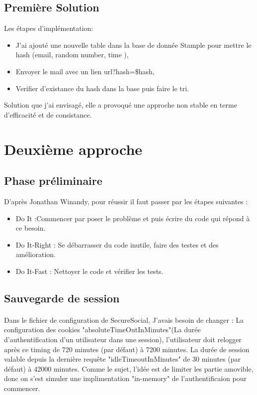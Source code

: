 \subsection{Première Solution}
Les étapes d'implémentation: 
\begin{itemize}
\item J'ai ajouté une nouvelle table dans la base de donnée Stample pour mettre le hash (email, random number, time ),
\item Envoyer le mail avec un lien url?hash=\$hash,
\item Verifier d'existance du hash dans la base puis faire le tri.

\end{itemize}
Solution que j'ai envisagé, elle a provoqué une approche non stable en terme d'efficacité et de consistance.
\newpage
\section{Deuxième approche}
\subsection{Phase préliminaire}
D'après Jonathan Winandy, pour réussir il faut passer par les étapes suivantes :
\begin{itemize}

\item Do It :Commencer par poser le problème et puis écrire du code qui répond à ce besoin.  
\item Do It-Right : Se débarrasser du code inutile, faire des testes et des amélioration.
\item Do It-Fast : Nettoyer le code et vérifier les tests.
\end{itemize}

\subsection{Sauvegarde de session}
\paragraph{}
Dans le fichier de configuration de SecureSocial, J'avais besoin de changer : La configuration des cookies "absoluteTimeOutInMinutes"(La durée d'authentification d'un utilisateur dans une session), l'utilisateur doit relogger après ce timing de 720 minutes (par défaut) à 7200 minutes.
La durée de session valable depuis la dernière requête  "idleTimeoutInMinutes" de 30 minutes (par défaut) à 42000 minutes.
Comme le sujet, l'idée est de limiter les partie amovible, donc on s'est simuler une implimentation "in-memory" de l'authentificaion pour commencer.
